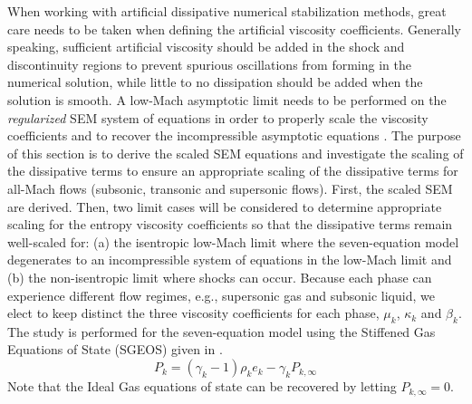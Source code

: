 \documentclass[preprint,10pt]{elsarticle}
\begin{document}
When working with artificial dissipative numerical stabilization methods, great care needs to be taken when defining the artificial viscosity coefficients. Generally speaking, sufficient artificial viscosity should be added in the shock and discontinuity regions to prevent spurious oscillations from forming in the numerical solution, while little to no dissipation should be added when the solution is smooth.
A low-Mach asymptotic limit needs to be performed on the {\it regularized} SEM system of equations in order to properly scale the viscosity coefficients and to recover the incompressible asymptotic equations \cite{LowMach1, LowMach2, LowMach3}. The purpose of this section is to derive the scaled SEM equations and investigate the scaling of the dissipative terms to ensure an appropriate scaling of the dissipative terms for all-Mach flows (subsonic, transonic and supersonic flows). First, the scaled SEM are derived. Then, two limit cases will be considered to determine appropriate scaling for the entropy 
viscosity coefficients so that the dissipative terms remain well-scaled for: 
(a) the isentropic low-Mach limit where the seven-equation model degenerates to an incompressible system of 
equations in the low-Mach limit and (b) the non-isentropic limit where shocks can occur. 
Because each phase can experience different flow regimes, e.g., supersonic gas and subsonic liquid, we elect to keep distinct the three viscosity coefficients for each phase, $\mu_k$, $\kappa_k$ and $\beta_k$. The study is performed for the seven-equation model using the Stiffened Gas Equations of State (SGEOS) given in .
%
\begin{equation}\label{eq:SGEOS_bis}
P_k = \left( \gamma_k-1 \right) \rho_k e_k - \gamma_k P_{k,\infty}
\end{equation}
Note that the Ideal Gas equations of state can be recovered by letting $P_{k,\infty}=0$.
%
\end{document}
